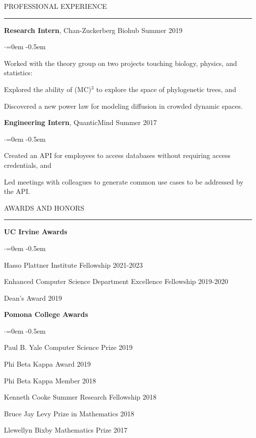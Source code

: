 \documentclass{resume} %
\renewenvironment{rSection}[1]{
\sectionskip
\textcolor{CarnegieMellonRed}{\MakeUppercase{#1}}
\sectionlineskip
\hrule
\begin{list}{}{
\setlength{\leftmargin}{1.5em}
}
\item[]
}{
\end{list}
}
\begin{document}
\begin{rSection}{Professional Experience}	
{\bf Research Intern}, Chan-Zuckerberg Biohub \hfill { Summer 2019}
\begin{list}{$\cdot$}{\leftmargin=0em} 
    \itemsep -0.5em \vspace{-0.5em}
      \item Worked with the theory group on two projects touching biology, physics, and statistics:
      \item Explored the ability of (MC)$^3$ to explore the space of phylogenetic trees, and
      \item Discovered a new power law for modeling diffusion in crowded dynamic spaces.
  \end{list}
  \vspace{1.em}

{\bf Engineering Intern}, QuanticMind \hfill { Summer 2017}
\begin{list}{$\cdot$}{\leftmargin=0em} 
    \itemsep -0.5em \vspace{-0.5em}
      \item Created an API for employees to access databases without requiring access credentials, and
      \item Led meetings with colleagues to generate common use cases to be addressed by the API.
  \end{list}
  \vspace{1.em}

\end{rSection}

\begin{rSection}{Awards and Honors}	
{\bf UC Irvine Awards}
\begin{list}{$\cdot$}{\leftmargin=0em} 
    \itemsep -0.5em \vspace{-0.5em}
\item Hasso Plattner Institute Fellowship\hfill { 2021-2023}
\item Enhanced Computer Science Department Excellence Fellowship\hfill { 2019-2020}
\item Dean's Award\hfill { 2019} 
\end{list} \vspace{0.5em}

{\bf Pomona College Awards}
\begin{list}{$\cdot$}{\leftmargin=0em} 
    \itemsep -0.5em \vspace{-0.5em}
\item Paul B. Yale Computer Science Prize \hfill { 2019}
\item Phi Beta Kappa Award \hfill { 2019}
\item Phi Beta Kappa Member  \hfill { 2018}
\item Kenneth Cooke Summer Research Fellowship \hfill { 2018}
\item Bruce Jay Levy Prize in Mathematics \hfill { 2018}
\item Llewellyn Bixby Mathematics Prize  \hfill { 2017}
\end{list}
\end{rSection}
\end{document}
